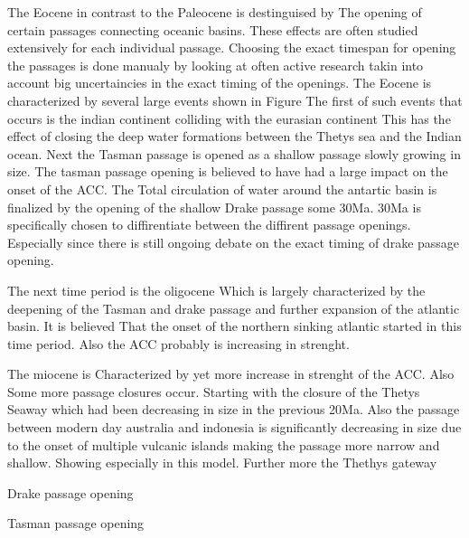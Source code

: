 \documentclass[a4paper]{article}
\begin{document}
\begin{multicols}{2}
The Eocene in contrast to the Paleocene is destinguised by The opening of certain passages connecting oceanic basins. These effects are often studied extensively for each individual passage. Choosing the exact timespan for opening the passages is done manualy by looking at often active research takin into account big uncertaincies in the exact timing of the openings. The Eocene is characterized by several large events shown in Figure %
The first of such events that occurs is the indian continent colliding with the eurasian continent This has the effect of closing the deep water formations between the Thetys sea and the Indian ocean.
Next the Tasman passage is opened\cite{Lawver2003Sep} as a shallow passage slowly growing in size. The tasman passage opening is believed to have had a large impact on the onset of the ACC. The Total circulation of water around the antartic basin is finalized by the opening of the shallow Drake passage some 30Ma. 30Ma is specifically chosen to diffirentiate between the diffirent passage openings. Especially since there is still ongoing debate on the exact timing of drake passage opening.

The next time period is the oligocene Which is largely characterized by the deepening of the Tasman and drake passage and further expansion of the atlantic basin. It is believed %
That the onset of the northern sinking atlantic started in this time period. Also the ACC probably is increasing in strenght.



The miocene is Characterized by yet more increase in strenght of the ACC. Also Some more passage closures occur. Starting with the closure of the Thetys Seaway which had been decreasing in size in the previous 20Ma. Also the passage between modern day australia and indonesia is significantly decreasing in size due to the onset  of multiple vulcanic islands making the passage more narrow and shallow. Showing especially in this model. Further more the Thethys gateway



Drake passage opening \cite{Scher2006Apr}

Tasman passage opening 


\end{multicols}
\end{document}
